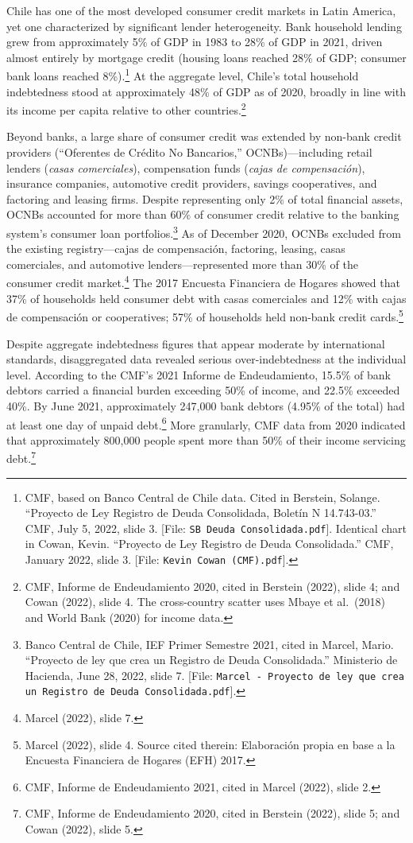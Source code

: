 \documentclass[12pt]{article}
\theoremstyle{plain}
\theoremstyle{plain}
\begin{document}
Chile has one of the most developed consumer credit markets in Latin America, yet one characterized by significant lender heterogeneity. Bank household lending grew from approximately 5\% of GDP in 1983 to 28\% of GDP in 2021, driven almost entirely by mortgage credit (housing loans reached 28\% of GDP; consumer bank loans reached 8\%).\footnote{CMF, based on Banco Central de Chile data. Cited in Berstein, Solange. ``Proyecto de Ley Registro de Deuda Consolidada, Bolet\'in N\textdegree{} 14.743-03.'' CMF, July 5, 2022, slide 3. [File: \texttt{SB Deuda Consolidada.pdf}]. Identical chart in Cowan, Kevin. ``Proyecto de Ley Registro de Deuda Consolidada.'' CMF, January 2022, slide 3. [File: \texttt{Kevin Cowan (CMF).pdf}].} At the aggregate level, Chile's total household indebtedness stood at approximately 48\% of GDP as of 2020, broadly in line with its income per capita relative to other countries.\footnote{CMF, Informe de Endeudamiento 2020, cited in Berstein (2022), slide 4; and Cowan (2022), slide 4. The cross-country scatter uses Mbaye et al.\ (2018) and World Bank (2020) for income data.}

Beyond banks, a large share of consumer credit was extended by non-bank credit providers (``Oferentes de Cr\'edito No Bancarios,'' OCNBs)—including retail lenders (\textit{casas comerciales}), compensation funds (\textit{cajas de compensaci\'on}), insurance companies, automotive credit providers, savings cooperatives, and factoring and leasing firms. Despite representing only 2\% of total financial assets, OCNBs accounted for more than 60\% of consumer credit relative to the banking system's consumer loan portfolios.\footnote{Banco Central de Chile, IEF Primer Semestre 2021, cited in Marcel, Mario. ``Proyecto de ley que crea un Registro de Deuda Consolidada.'' Ministerio de Hacienda, June 28, 2022, slide 7. [File: \texttt{Marcel - Proyecto de ley que crea un Registro de Deuda Consolidada.pdf}].} As of December 2020, OCNBs excluded from the existing registry—cajas de compensaci\'on, factoring, leasing, casas comerciales, and automotive lenders—represented more than 30\% of the consumer credit market.\footnote{Marcel (2022), slide 7.} The 2017 Encuesta Financiera de Hogares showed that 37\% of households held consumer debt with casas comerciales and 12\% with cajas de compensaci\'on or cooperatives; 57\% of households held non-bank credit cards.\footnote{Marcel (2022), slide 4. Source cited therein: Elaboraci\'on propia en base a la Encuesta Financiera de Hogares (EFH) 2017.}

Despite aggregate indebtedness figures that appear moderate by international standards, disaggregated data revealed serious over-indebtedness at the individual level. According to the CMF's 2021 Informe de Endeudamiento, 15.5\% of bank debtors carried a financial burden exceeding 50\% of income, and 22.5\% exceeded 40\%. By June 2021, approximately 247,000 bank debtors (4.95\% of the total) had at least one day of unpaid debt.\footnote{CMF, Informe de Endeudamiento 2021, cited in Marcel (2022), slide 2.} More granularly, CMF data from 2020 indicated that approximately 800,000 people spent more than 50\% of their income servicing debt.\footnote{CMF, Informe de Endeudamiento 2020, cited in Berstein (2022), slide 5; and Cowan (2022), slide 5.}
\end{document}
